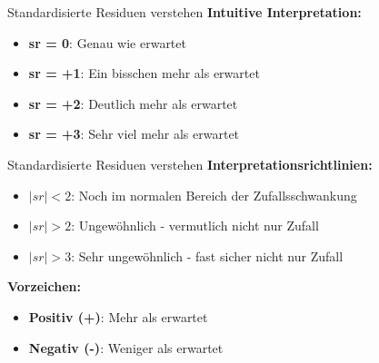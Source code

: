 \documentclass[
  ignorenonframetext,
]{beamer}
\providecommand{\tightlist}{%
  \setlength{\itemsep}{0pt}\setlength{\parskip}{0pt}}
\begin{document}
\begin{frame}{Standardisierte Residuen verstehen}
\protect{}\label{standardisierte-residuen-verstehen}
\textbf{Intuitive Interpretation:}

\begin{itemize}
\tightlist
\item
  \textbf{sr = 0}: Genau wie erwartet
\item
  \textbf{sr = +1}: Ein bisschen mehr als erwartet
\item
  \textbf{sr = +2}: Deutlich mehr als erwartet
\item
  \textbf{sr = +3}: Sehr viel mehr als erwartet
\end{itemize}
\end{frame}

\begin{frame}{Standardisierte Residuen verstehen}
\protect{}\label{standardisierte-residuen-verstehen-1}
\textbf{Interpretationsrichtlinien:}

\begin{itemize}
\tightlist
\item
  \(|sr| < 2\): Noch im normalen Bereich der Zufallsschwankung
\item
  \(|sr| > 2\): Ungewöhnlich - vermutlich nicht nur Zufall
\item
  \(|sr| > 3\): Sehr ungewöhnlich - fast sicher nicht nur Zufall
\end{itemize}

\textbf{Vorzeichen:}

\begin{itemize}
\tightlist
\item
  \textbf{Positiv (+)}: Mehr als erwartet
\item
  \textbf{Negativ (-)}: Weniger als erwartet
\end{itemize}
\end{frame}
\end{document}
